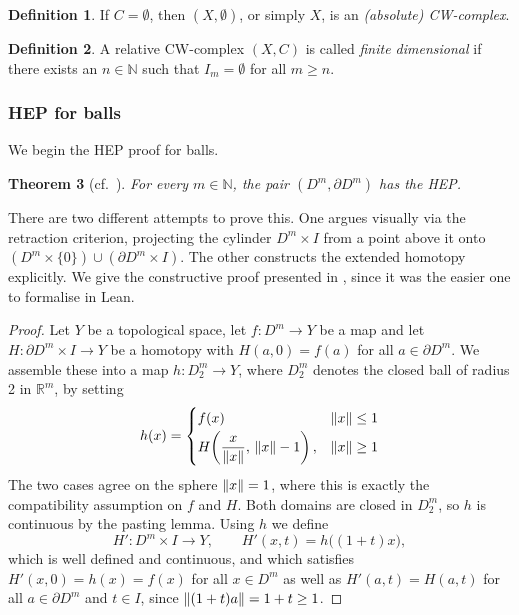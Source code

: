 \documentclass[11pt, a4paper, english]{article}
\DeclarePairedDelimiter\norm{\lVert}{\rVert}
\theoremstyle{plain}
\newtheorem{theorem}{Theorem}
\theoremstyle{definition}
\newtheorem{definition}[theorem]{Definition}
\theoremstyle{remark}
\numberwithin{equation}{section}
\numberwithin{theorem}{section}
\begin{document}
\begin{definition}
    If $C = \emptyset$, then $(X,\emptyset)$, or simply $X$, is an \emph{(absolute) CW-complex}.
\end{definition}

\begin{definition}
    A relative CW-complex $(X,C)$ is called \emph{finite dimensional} if there exists an $n \in \mathbb{N}$ such that $I_m = \emptyset$ for all $ m \ge n$.
\end{definition}

\subsubsection{HEP for balls} \label{subsubsec:HEP_ball}

We begin the HEP proof for balls.
\begin{theorem} [cf.\ {\cite[Lemma 11]{JHU}}] \label{thm:HEPball}
    For every $m \in \mathbb{N}$, the pair $(D^m, \partial D^m)$ has the HEP.
\end{theorem}

There are two different attempts to prove this. One argues visually via the retraction criterion, projecting the cylinder $D^m \times I$ from a point above it onto $(D^m \times \{0\}) \cup (\partial D^m \times I)$. The other constructs the extended homotopy explicitly. We give the constructive proof presented in {\cite[Lemma 11]{JHU}}, since it was the easier one to formalise in Lean.

\begin{proof}
    Let $Y$ be a topological space, let $f \colon D^m \to Y$ be a map and let $H \colon \partial D^m \times I \to Y$ be a homotopy with $H(a,0) = f(a)$ for all $a \in \partial D^m$. We assemble these into a map $ h \colon D_2^m \to Y $, where $D_2^m $ denotes the closed ball of radius 2 in $ \mathbb{R}^m $, by setting
\[
    h (x) = 
    \begin{cases}
        f(x) & \norm{x}  \leq 1 \\[2pt]
        H\!\left(\dfrac{x}{\norm{x}},\, \norm{x} - 1\right), & \norm{x} \ge 1  
    \end{cases}
\] 
    The two cases agree on the sphere $\norm{x} = 1$, where this is exactly the compatibility assumption on $f$ and $H$. Both domains are closed in $D_2^m$, so $h$ is continuous by the pasting lemma. Using $h$ we define
    \[
        H' \colon D^m \times I \to Y, \qquad H'(x,t) = h\big((1+t)x\big),
    \]
    which is well defined and continuous, and which satisfies $H'(x,0) = h(x) = f(x)$ for all $x \in D^m$ as well as $H'(a,t) = H(a,t)$ for all $a \in \partial D^m$ and $t \in I$, since $\norm{(1+t)a} = 1+t \ge 1$.
\end{proof}
\end{document}
